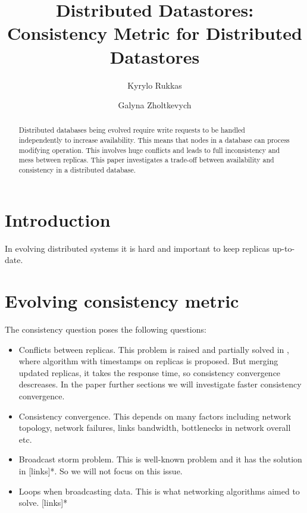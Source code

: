 \documentclass{llncs}
\begin{document}
\title{Distributed Datastores: Consistency Metric for Distributed Datastores}
\author{Kyrylo Rukkas\and Galyna Zholtkevych}
\maketitle
\begin{abstract}
Distributed databases being evolved require write requests to be handled independently to increase availability.
This means that nodes in a database can process modifying operation. This involves huge conflicts and leads to
full inconsistency and mess between replicas. This paper investigates a trade-off between availability and consistency
in a distributed database.
\end{abstract}

\section{Introduction}\label{sec:intro}
In evolving distributed systems it is hard and important to keep replicas up-to-date.

\section{Evolving consistency metric}
The consistency question poses the following questions:
\begin{itemize}
\item Conflicts between replicas. This problem is raised and partially solved in 
\cite{bib:c_ts}, where algorithm with timestamps on replicas is proposed. But merging
updated replicas, it takes the response time, so consistency convergence descreases.
In the paper further sections we will investigate faster consistency convergence.
\item Consistency convergence. This depends on many factors including network topology,
network failures, links bandwidth, bottlenecks in network overall etc.
\item Broadcast storm problem. This is well-known problem and it has the solution in [links]*.
So we will not focus on this issue.
\item Loops when broadcasting data. This is what networking algorithms aimed to solve. [links]*
\end{itemize}
\end{document}

